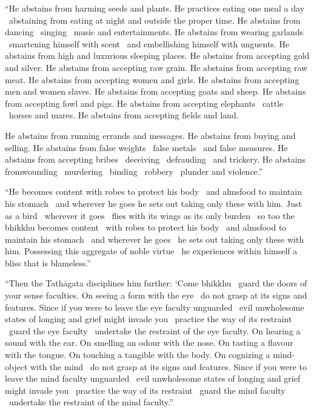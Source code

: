 “He abstains from harming seeds and plants. He practices eating one meal a day \breathmark\ abstaining from eating at night and outside the proper time. He abstains from dancing \breathmark\ singing \breathmark\ music and entertainments. He abstains from wearing garlands \breathmark\ smartening himself with scent \breathmark\ and embellishing himself with unguents. He abstains from high and luxurious sleeping places. He abstains from accepting gold and silver. He abstains from accepting raw grain. He abstains from accepting raw meat. He abstains from accepting women and girls. He abstains from accepting men and women slaves. He abstains from accepting goats and sheep. He abstains from accepting fowl and pigs. He abstains from accepting elephants \breathmark\ cattle \breathmark\ horses and mares. He abstains from accepting fields and land.

He abstains from running errands and messages. He abstains from buying and selling. He abstains from false weights \breathmark\ false metals \breathmark\ and false measures. He abstains from accepting bribes \breathmark\ deceiving \breathmark\ defrauding \breathmark\ and trickery. He abstains fromwounding \breathmark\ murdering \breathmark\ binding \breathmark\ robbery \breathmark\ plunder and violence.”

“He becomes content with robes to protect his body \breathmark\ and almsfood to maintain his stomach \breathmark\ and wherever he goes he sets out taking only these with him. Just as a bird \breathmark\ wherever it goes \breathmark\ flies with its wings as its only burden \breathmark\ so too the bhikkhu becomes content \breathmark\ with robes to protect his body \breathmark\ and almsfood to maintain his stomach \breathmark\ and wherever he goes \breathmark\ he sets out taking only these with him. Possessing this aggregate of noble virtue \breathmark\ he experiences within himself a bliss that is blameless.”

\suttaRef{[MN 51]}

“Then the Tathāgata disciplines him further: ‘Come bhikkhu \breathmark\ guard the doors of your sense faculties. On seeing a form with the eye \breathmark\ do not grasp at its signs and features. Since if you were to leave the eye faculty unguarded \breathmark\ evil unwholesome states of longing and grief might invade you \breathmark\ practice the way of its restraint \breathmark\ guard the eye faculty \breathmark\ undertake the restraint of the eye faculty. On hearing a sound with the ear. On smelling an odour with the nose. On tasting a flavour with the tongue. On touching a tangible with the body. On cognizing a mind-object with the mind \breathmark\ do not grasp at its signs and features. Since if you were to leave the mind faculty unguarded \breathmark\ evil unwholesome states of longing and grief might invade you \breathmark\ practice the way of its restraint \breathmark\ guard the mind faculty \breathmark\ undertake the restraint of the mind faculty.”

